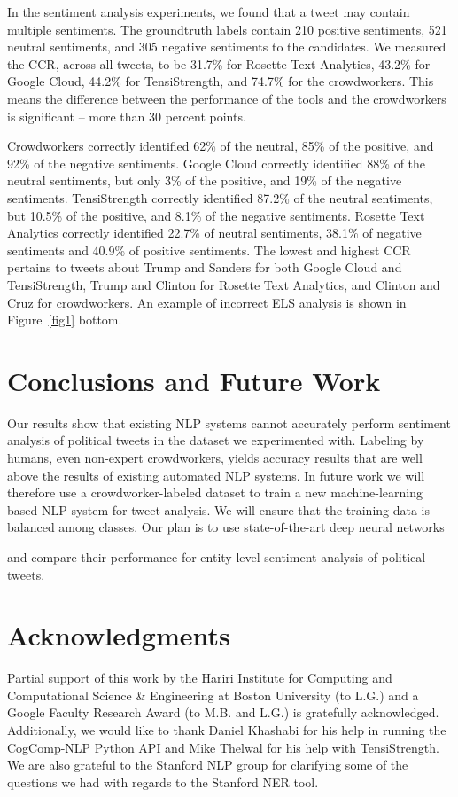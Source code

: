 \documentclass[11pt,a4paper]{article}
\begin{document}
In the sentiment analysis experiments, we found that a tweet may contain multiple sentiments. The groundtruth labels contain 210 positive sentiments, 521 neutral sentiments, and 305 negative sentiments to the candidates.  
We measured the CCR, across all tweets, to be 31.7\% for Rosette Text Analytics, 43.2\% for Google Cloud, 44.2\% for TensiStrength, and 74.7\% for the crowdworkers.  This means the difference between the performance of the tools and the crowdworkers is significant -- more than 30 percent points.

Crowdworkers correctly identified 62\% of the neutral, 85\% of the positive, and 92\% of the negative sentiments. Google Cloud correctly identified 88\% of the neutral sentiments, but only 3\% of the positive, and 19\% of the negative sentiments.  TensiStrength correctly identified 87.2\% of the neutral sentiments, but 10.5\% of the positive, and 8.1\% of the negative sentiments. Rosette Text Analytics correctly identified 22.7\% of neutral sentiments, 38.1\% of negative sentiments and 40.9\% of positive sentiments. The lowest and highest CCR pertains to tweets about Trump and Sanders for both Google Cloud and TensiStrength, Trump and Clinton for Rosette Text Analytics, and Clinton and Cruz for crowdworkers. An example of incorrect ELS analysis is shown in Figure~\ref{fig1} bottom.


\section{Conclusions and Future Work}

Our results show that existing NLP systems cannot accurately perform sentiment analysis of political tweets in the dataset we experimented with.  Labeling by humans, even non-expert crowdworkers, yields accuracy results that are well above the results of existing automated NLP systems.  In future work we will therefore use a crowdworker-labeled dataset to train a new machine-learning based NLP system for tweet analysis.   We will ensure that the training data is balanced among classes.  Our plan is to use state-of-the-art deep neural networks   

and compare their performance for entity-level sentiment analysis of political tweets. 


\clearpage
\section*{Acknowledgments}
Partial support of this work by the Hariri Institute for Computing and Computational Science \& Engineering at Boston University (to L.G.) and a Google Faculty Research Award (to M.B. and L.G.) is gratefully acknowledged. Additionally, we would like to thank Daniel Khashabi for his help in running the CogComp-NLP Python API and Mike Thelwal for his help with TensiStrength. We are also grateful to the Stanford NLP group for clarifying some of the questions we had with regards to the Stanford NER tool. 






\appendix
\end{document}
